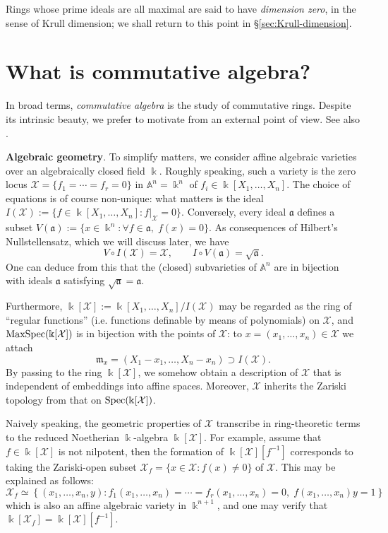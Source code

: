 Rings whose prime ideals are all maximal are said to have \emph{dimension zero}, in the sense of Krull dimension; we shall return to this point in \S\ref{sec:Krull-dimension}.

\section{What is commutative algebra?}
In broad terms, \emph{commutative algebra} is the study of commutative rings. Despite its intrinsic beauty, we prefer to motivate from an external point of view. See also \cite{Eis95}.

\begin{asparaenum}[(A)]
	\item \textbf{Algebraic geometry}. To simplify matters, we consider affine algebraic varieties over an algebraically closed field $\Bbbk$. Roughly speaking, such a variety is the zero locus $\mathcal{X} = \{ f_1 = \cdots = f_r = 0 \}$ in $\mathbb{A}^n = \Bbbk^n$ of $f_i \in \Bbbk[X_1, \ldots, X_n]$. The choice of equations is of course non-unique: what matters is the ideal $I(\mathcal{X}) := \{ f \in \Bbbk[X_1, \ldots, X_n] : f|_{\mathcal{X}} = 0 \}$. Conversely, every ideal $\mathfrak{a}$ defines a subset $V(\mathfrak{a}) := \{x \in \Bbbk^n : \forall f \in \mathfrak{a}, \; f(x)=0 \}$. As consequences of Hilbert's Nullstellensatz, which we will discuss later, we have
	\[ V \circ I(\mathcal{X}) = \mathcal{X}, \qquad I \circ V(\mathfrak{a})  = \sqrt{\mathfrak{a}}. \]
	One can deduce from this that the (closed) subvarieties of $\mathbb{A}^n$ are in bijection with ideals $\mathfrak{a}$ satisfying $\sqrt{\mathfrak{a}} = \mathfrak{a}$.

	Furthermore, $\Bbbk[\mathcal{X}] := \Bbbk[X_1, \ldots, X_n]/I(\mathcal{X})$ may be regarded as the ring of ``regular functions'' (i.e. functions definable by means of polynomials) on $\mathcal{X}$, and $\operatorname{MaxSpec}(\Bbbk[\mathcal{X}])$ is in bijection with the points of $\mathcal{X}$: to $x = (x_1, \ldots, x_n) \in \mathcal{X}$ we attach
	\[ \mathfrak{m}_x = (X_1 - x_1, \ldots, X_n - x_n) \supset I(\mathcal{X}). \]
	By passing to the ring $\Bbbk[\mathcal{X}]$, we somehow obtain a description of $\mathcal{X}$ that is independent of embeddings into affine spaces. Moreover, $\mathcal{X}$ inherits the Zariski topology from that on $\operatorname{Spec}(\Bbbk[\mathcal{X}])$.

	Naively speaking, the geometric properties of $\mathcal{X}$ transcribe in ring-theoretic terms to the reduced Noetherian $\Bbbk$-algebra $\Bbbk[\mathcal{X}]$. For example, assume that $f \in \Bbbk[\mathcal{X}]$ is not nilpotent, then the formation of $\Bbbk[\mathcal{X}][f^{-1}]$ corresponds to taking the Zariski-open subset $\mathcal{X}_f = \{x \in \mathcal{X}: f(x) \neq 0 \}$ of $\mathcal{X}$. This may be explained as follows:
	\[ \mathcal{X}_f \simeq \left\{ (x_1, \ldots, x_n, y) : f_1(x_1, \ldots, x_n) = \cdots = f_r(x_1, \ldots, x_n) = 0, \; f(x_1, \ldots, x_n)y = 1 \right\} \]
	which is also an affine algebraic variety in $\Bbbk^{n+1}$, and one may verify that $\Bbbk[\mathcal{X}_f] = \Bbbk[\mathcal{X}][f^{-1}]$.


\end{asparaenum}
